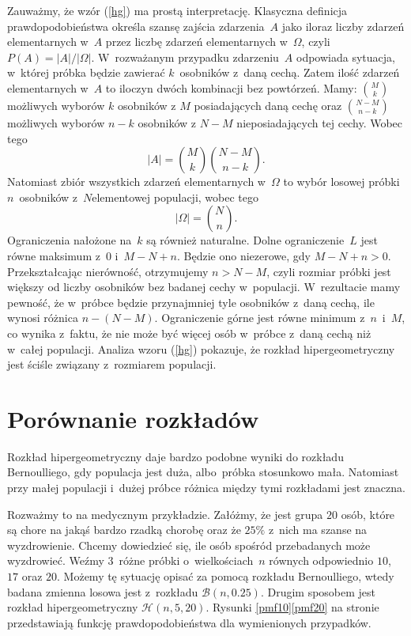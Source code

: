 Zauważmy, że wzór (\ref{hg}) ma prostą interpretację. Klasyczna definicja prawdopodobieństwa określa szansę zajścia zdarzenia~$A$ jako iloraz liczby zdarzeń elementarnych w~$A$ przez liczbę zdarzeń elementarnych w~$\Omega$, czyli $P(A) = |A|/|\Omega|$. W~rozważanym przypadku zdarzeniu~$A$ odpowiada sytuacja, w~której próbka będzie zawierać $k$~osobników z~daną cechą. Zatem ilość zdarzeń elementarnych w~$A$ to iloczyn dwóch kombinacji bez powtórzeń. Mamy: {\small $\binom{M}{k}$} możliwych wyborów $k$ osobników z $M$ posiadających daną cechę oraz {\small $\binom{N-M}{n-k}$} możliwych wyborów $n-k$ osobników z $N-M$ nieposiadających tej cechy. Wobec tego
\begin{equation}
|A| = \binom{M}{k} \binom{N-M}{n-k}.
\end{equation}
Natomiast zbiór wszystkich zdarzeń elementarnych w~$\Omega$ to wybór losowej próbki $n$~osobników z~$N$\dywiz elementowej populacji, wobec tego
\begin{equation}
|\Omega| = \binom{N}{n}.
\end{equation}
Ograniczenia nałożone na~$k$ są również naturalne. Dolne ograniczenie~$L$ jest równe maksimum z~$0$ i~$M-N+n$. Będzie ono niezerowe, gdy $M-N+n>0$. Przekształcając nierówność, otrzymujemy $n>N-M$, czyli rozmiar próbki jest większy od liczby osobników bez badanej cechy w~populacji. W~rezultacie mamy pewność, że w~próbce będzie przynajmniej tyle osobników z~daną cechą, ile wynosi różnica $n-(N-M)$. Ograniczenie górne jest równe minimum z~$n$~i~$M$, co wynika z~faktu, że nie może być więcej osób w~próbce z~daną cechą niż w~całej populacji. Analiza wzoru (\ref{hg}) pokazuje, że rozkład hipergeometryczny jest ściśle związany z~rozmiarem populacji.

\section{Porównanie rozkładów}

Rozkład hipergeometryczny daje bardzo podobne wyniki do rozkładu Bernoulliego, gdy populacja jest duża, albo~próbka stosunkowo mała. Natomiast przy małej populacji i~dużej próbce różnica między tymi rozkładami jest znaczna.

Rozważmy to na medycznym przykładzie. Załóżmy, że jest grupa $20$ osób, które są chore na jakąś bardzo rzadką chorobę oraz że $25\%$ z~nich ma szanse na wyzdrowienie. Chcemy dowiedzieć się, ile osób spośród przebadanych może wyzdrowieć. Weźmy $3$~różne próbki o~wielkościach~$n$ równych odpowiednio $10$, $17$ oraz $20$. Możemy tę sytuację opisać za pomocą rozkładu Bernoulliego, wtedy badana zmienna losowa jest z~rozkładu $\mathcal{B}(n,0.25)$. Drugim sposobem jest rozkład hipergeometryczny $\mathcal{H}(n,5,20)$. Rysunki \ref{pmf10}\ppauza\ref{pmf20} na stronie~\pageref{pmf10} przedstawiają funkcję prawdopodobieństwa dla wymienionych przypadków.

